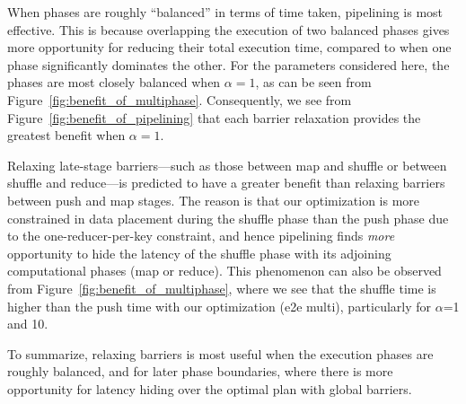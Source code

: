 \begin{myitemize}
  \item
  When phases are roughly ``balanced'' in terms of time taken, pipelining is
  most effective.
  This is because overlapping the execution of two balanced phases gives more
  opportunity for reducing their total execution time, compared to when one
  phase significantly dominates the other.
  For the parameters considered here, the phases are most closely balanced when
  $\alpha=1$, as can be seen from Figure~\ref{fig:benefit_of_multiphase}.
  Consequently, we see from Figure~\ref{fig:benefit_of_pipelining} that each
  barrier relaxation provides the greatest benefit when $\alpha=1$.

  \item
  Relaxing late-stage barriers---such as those between map and shuffle or
  between shuffle and reduce---is predicted to have a greater benefit than
  relaxing barriers between push and map stages.
  The reason is that our optimization is more constrained in data placement
  during the shuffle phase than the push phase due to the one-reducer-per-key
  constraint, and hence pipelining finds {\em more} opportunity to hide the
  latency of the shuffle phase with its adjoining computational phases (map or
  reduce).
  This phenomenon can also be observed from
  Figure~\ref{fig:benefit_of_multiphase}, where we see that the shuffle time is
  higher than the push time with our optimization (e2e multi), particularly for
  $\alpha$=1 and 10.
\end{myitemize}

To summarize, relaxing barriers is most useful when the execution phases are
roughly balanced, and for later phase boundaries, where there is more
opportunity for latency hiding over the optimal plan with global barriers.

